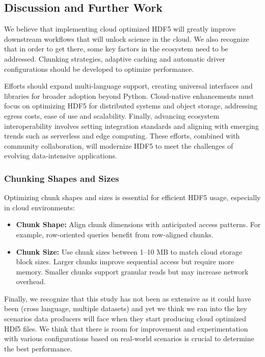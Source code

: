 \documentclass[
]{agujournal2019}
\providecommand{\tightlist}{%
  \setlength{\itemsep}{0pt}\setlength{\parskip}{0pt}}
\begin{document}
\subsection{Discussion and Further
Work}\label{discussion-and-further-work}

We believe that implementing cloud optimized HDF5 will greatly improve
downstream workflows that will unlock science in the cloud. We also
recognize that in order to get there, some key factors in the ecosystem
need to be addressed. Chunking strategies, adaptive caching and
automatic driver configurations should be developed to optimize
performance.

Efforts should expand multi-language support, creating universal
interfaces and libraries for broader adoption beyond Python.
Cloud-native enhancements must focus on optimizing HDF5 for distributed
systems and object storage, addressing egress costs, ease of use and
scalability. Finally, advancing ecosystem interoperability involves
setting integration standards and aligning with emerging trends such as
serverless and edge computing. These efforts, combined with community
collaboration, will modernize HDF5 to meet the challenges of evolving
data-intensive applications.

\subsubsection{Chunking Shapes and
Sizes}\label{chunking-shapes-and-sizes}

Optimizing chunk shapes and sizes is essential for efficient HDF5 usage,
especially in cloud environments:

\begin{itemize}
\tightlist
\item
  \textbf{Chunk Shape:} Align chunk dimensions with anticipated access
  patterns. For example, row-oriented queries benefit from row-aligned
  chunks.
\item
  \textbf{Chunk Size:} Use chunk sizes between 1--10 MB to match cloud
  storage block sizes. Larger chunks improve sequential access but
  require more memory. Smaller chunks support granular reads but may
  increase network overhead.
\end{itemize}

Finally, we recognize that this study has not been as extensive as it
could have been (cross language, multiple datasets) and yet we think we
ran into the key scenarios data producers will face when they start
producing cloud optimized HDf5 files. We think that there is room for
improvement and experimentation with various configurations based on
real-world scenarios is crucial to determine the best performance.
\end{document}
